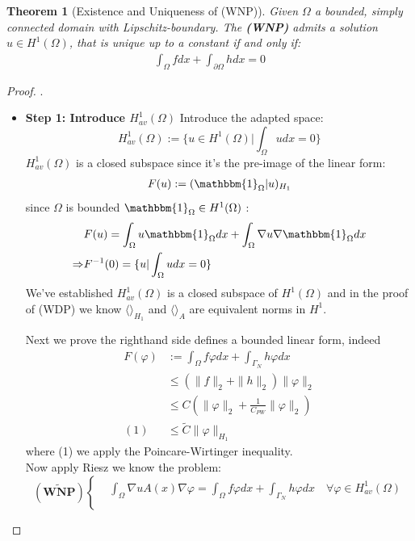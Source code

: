 \documentclass[a4paper,11pt,oneside,fleqn]{book}
\newtheorem{theorem}{Theorem}[section]
\theoremstyle{definition}
\theoremstyle{remark}
\begin{document}
\begin{theorem}[Existence and Uniqueness of (WNP)]
	Given $\Omega$ a bounded, simply connected domain with Lipschitz-boundary. The \textbf{(WNP)} admits a solution $u \in H^1(\Omega)$,  that is unique up to a constant if and only if:
	\begin{align*}
		\int_\Omega fdx + \int_{\partial \Omega} hdx = 0
	\end{align*}
\end{theorem}
\begin{proof}.
\begin{itemize}
\item \textbf{Step 1: Introduce $H^1_{av}(\Omega)$} 
Introduce the adapted space:
\begin{equation}
	H^1_{av}(\Omega) := \{ u \in H^1(\Omega)| \int_\Omega u dx = 0\}
\end{equation}
$H^1_{av}(\Omega)$ is a closed subspace since it's the pre-image of the linear form:
\begin{align*}
	F(u):= ( \mathbbm{1}_{\Omega}| u )_{H_1}
\end{align*}
since $\Omega$ is bounded $\mathbbm{1}_{\Omega} \in H^1(\Omega)$ :
\begin{align*}
	&F(u) = \int_\Omega u \mathbbm{1}_{\Omega} dx + \int_\Omega \nabla u  \nabla \mathbbm{1}_{\Omega} dx \\
	\Rightarrow &F^{-1}(0) = \{u |\int_\Omega u dx = 0 \}
\end{align*}
We've established $H_{av}^1(\Omega)$ is a closed subspace of $H^1(\Omega)$ and in the proof of (WDP) we know $\langle \rangle_{H_1}$ and $\langle \rangle_{A}$ are equivalent norms in $H^1$.\par
Next we prove the righthand side defines a bounded linear form, indeed
\begin{align*}
	F(\varphi)&:= \int_\Omega f\varphi dx + \int_{\Gamma_N} h\varphi dx\\
	&\leq (\|f\|_2 + \|h\|_2) \|\varphi\|_2 \\
	&\leq C(\|\varphi\|_2 + \frac{1}{C_{PW}}\|\varphi\|_2)\\
 (1)&\leq \tilde{C} \|\varphi\|_{H_1}
\end{align*}
where (1) we apply the Poincare-Wirtinger inequality.\\
Now apply Riesz we know the problem:
\begin{equation*}
(\tilde{\textbf{WNP}})\left\{
\begin{aligned}
	&\int_\Omega \nabla u A(x) \nabla \varphi = \int_\Omega f\varphi dx + \int_{\Gamma_N} h\varphi dx \quad \forall \varphi \in H^1_{av}(\Omega)\\

\end{aligned}
\end{equation*}
\end{itemize}
\end{proof}
\end{document}
